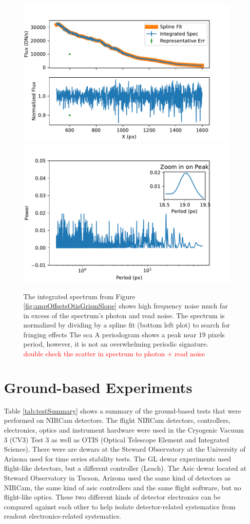 \documentclass{aastex62}
\begin{document}
\begin{figure}[!hbtp]
\centering
\includegraphics[width=.49\columnwidth]{otis_spec_and_norm.pdf}
\includegraphics[width=.49\columnwidth]{otis_spec_periodogram.pdf}
\caption{The integrated spectrum from Figure \ref{fig:ampOffsetsOtisGrismSlope} shows high frequency noise much far in excess of the spectrum's photon and read noise.
The spectrum is normalized by dividing by a spline fit (bottom left plot) to search for fringing effects
The sca
A periodogram shows a peak near 19 pixels period, however, it is not an overwhelming periodic signature.
\textcolor{red}{double check the scatter in spectrum to photon + read noise}
}\label{fig:integratedOtisGrismSpec}
\end{figure}

\clearpage
\section{Ground-based Experiments}\label{sec:experiments}

Table \ref{tab:testSummary} shows a summary of the ground-based tests that were performed on NIRCam detectors.
The flight NIRCam detectors, controllers, electronics, optics and instrument hardware were used in the Cryogenic Vacuum 3 (CV3) Test 3 as well as OTIS (Optical Telescope Element and Integrated Science).
There were are dewars at the Steward Observatory at the University of Arizona used for time series stability tests.
The GL dewar experiments used flight-like detectors, but a different controller (Leach).
The Asic dewar located at Steward Observatory in Tucson, Arizona used the same kind of detectors as NIRCam, the same kind of asic controllers and the same flight software, but no flight-like optics.
These two different kinds of detector electronics can be compared against each other to help isolate detector-related systematics from readout electronics-related systematics.
\end{document}
